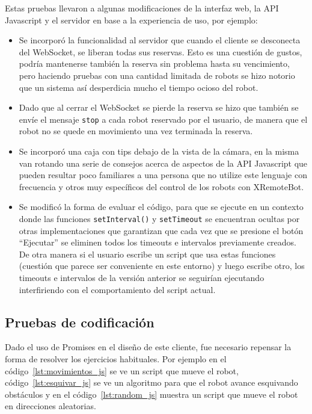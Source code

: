 Estas pruebas llevaron a algunas modificaciones de la interfaz
web, la API Javascript y el servidor en base a la experiencia de uso,
por ejemplo:
\begin{itemize}
    \item Se incorporó la funcionalidad al servidor que cuando
        el cliente se desconecta del WebSocket, se liberan todas
        sus reservas. Esto es una cuestión de gustos, podría
        mantenerse también la reserva sin problema hasta su
        vencimiento, pero haciendo pruebas con una cantidad
        limitada de robots se hizo notorio que un sistema
        así desperdicia mucho el tiempo ocioso del robot.
    \item Dado que al cerrar el WebSocket se pierde la reserva
        se hizo que también se envíe el mensaje \texttt{stop}
        a cada robot reservado por el usuario, de manera
        que el robot no se quede en movimiento una vez
        terminada la reserva.
    \item Se incorporó una caja con tips debajo de la vista de
        la cámara, en la misma van rotando una serie de consejos
        acerca de aspectos de la API Javascript que pueden
        resultar poco familiares a una persona que no utilize este
        lenguaje con frecuencia y otros muy específicos
        del control de los robots con XRemoteBot.
    \item Se modificó la forma de evaluar el código, para que se
        ejecute en un contexto donde las funciones
        \texttt{setInterval()} y \texttt{setTimeout} se encuentran
        ocultas por otras implementaciones que garantizan que cada
        vez que se presione el botón ``Ejecutar'' se eliminen
        todos los timeouts e intervalos previamente creados.
        De otra manera si el usuario escribe un script que usa
        estas funciones
        (cuestión que parece ser conveniente en este entorno)
        y luego escribe otro, los timeouts e intervalos
        de la versión anterior se seguirían ejecutando
        interfiriendo con el comportamiento del script actual.
\end{itemize}

\subsection{Pruebas de codificación}

Dado el uso de Promises en el diseño de este cliente, fue
necesario repensar la forma
de resolver los ejercicios habituales. Por ejemplo en el
código~\ref{lst:movimientos_js} se ve un script que mueve el
robot,
código~\ref{lst:esquivar_js} se ve un algoritmo para que el robot
avance esquivando obstáculos y en el código~\ref{lst:random_js}
muestra un script que mueve el robot en direcciones aleatorias.

